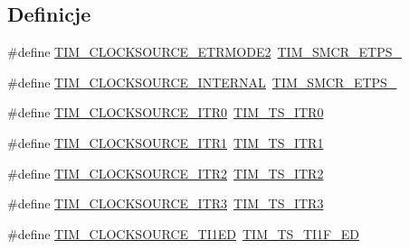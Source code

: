\subsection*{Definicje}
\begin{DoxyCompactItemize}
\item 
\#define \hyperlink{group___t_i_m___clock___source_gab133f0839cf6a4e858457d48f057eea8}{T\+I\+M\+\_\+\+C\+L\+O\+C\+K\+S\+O\+U\+R\+C\+E\+\_\+\+E\+T\+R\+M\+O\+D\+E2}~\hyperlink{group___peripheral___registers___bits___definition_gabf12f04862dbc92ca238d1518b27b16b}{T\+I\+M\+\_\+\+S\+M\+C\+R\+\_\+\+E\+T\+P\+S\+\_}
\item 
\#define \hyperlink{group___t_i_m___clock___source_ga9b398a201d8b6a4f200ebde86b1d8f3a}{T\+I\+M\+\_\+\+C\+L\+O\+C\+K\+S\+O\+U\+R\+C\+E\+\_\+\+I\+N\+T\+E\+R\+N\+AL}~\hyperlink{group___peripheral___registers___bits___definition_ga00b43cd09557a69ed10471ed76b228d8}{T\+I\+M\+\_\+\+S\+M\+C\+R\+\_\+\+E\+T\+P\+S\+\_}
\item 
\#define \hyperlink{group___t_i_m___clock___source_ga3310aa84f2f322eb77538997c070e56a}{T\+I\+M\+\_\+\+C\+L\+O\+C\+K\+S\+O\+U\+R\+C\+E\+\_\+\+I\+T\+R0}~\hyperlink{group___t_i_m___trigger___selection_gab7cf2b7db3956d4fd1e5a5d84f4891e7}{T\+I\+M\+\_\+\+T\+S\+\_\+\+I\+T\+R0}
\item 
\#define \hyperlink{group___t_i_m___clock___source_gae2da814f8d86491e7c344bb8d0f62b96}{T\+I\+M\+\_\+\+C\+L\+O\+C\+K\+S\+O\+U\+R\+C\+E\+\_\+\+I\+T\+R1}~\hyperlink{group___t_i_m___trigger___selection_gad90fbca297153ca9c0112a67ea2c6cb3}{T\+I\+M\+\_\+\+T\+S\+\_\+\+I\+T\+R1}
\item 
\#define \hyperlink{group___t_i_m___clock___source_gafb779719a41769b14303da4977f6a5f1}{T\+I\+M\+\_\+\+C\+L\+O\+C\+K\+S\+O\+U\+R\+C\+E\+\_\+\+I\+T\+R2}~\hyperlink{group___t_i_m___trigger___selection_ga8599ba58a5f911d648503c7ac55d4320}{T\+I\+M\+\_\+\+T\+S\+\_\+\+I\+T\+R2}
\item 
\#define \hyperlink{group___t_i_m___clock___source_ga0cce2af04ad903ba683515c3772abb27}{T\+I\+M\+\_\+\+C\+L\+O\+C\+K\+S\+O\+U\+R\+C\+E\+\_\+\+I\+T\+R3}~\hyperlink{group___t_i_m___trigger___selection_ga63183e611b91c5847040172c0069514d}{T\+I\+M\+\_\+\+T\+S\+\_\+\+I\+T\+R3}
\item 
\#define \hyperlink{group___t_i_m___clock___source_gad8c96337acf40356d82570cc4851ce2d}{T\+I\+M\+\_\+\+C\+L\+O\+C\+K\+S\+O\+U\+R\+C\+E\+\_\+\+T\+I1\+ED}~\hyperlink{group___t_i_m___trigger___selection_ga8c89554efc693e679c94b5a749af123c}{T\+I\+M\+\_\+\+T\+S\+\_\+\+T\+I1\+F\+\_\+\+ED}
\item 

\end{DoxyCompactItemize}
